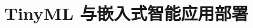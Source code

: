 \documentclass[../../main.tex]{subfiles}
\begin{document}
\chapter{TinyML 与嵌入式智能应用部署}
\label{ch:08-edge-intelligence}




\end{document}
